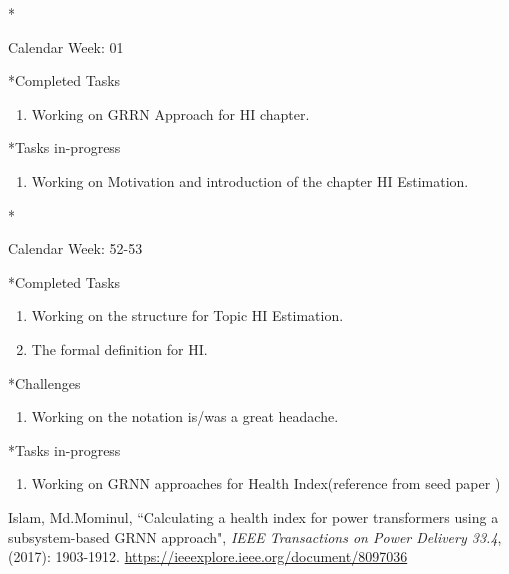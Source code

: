 \documentclass[11pt,a4paper]{article}
\begin{document}
\newpage
\begin{section}*{Calendar Week: 01 \hfill \date{08 January, 2021}}

\begin{subsection}*{Completed Tasks}
    \begin{enumerate}
        \item
        Working on GRRN Approach for HI chapter.
    \end{enumerate}
\end{subsection}

\begin{subsection}*{Tasks in-progress}
    \begin{enumerate}
        \item
        Working on Motivation and introduction of the chapter HI Estimation. 
    \end{enumerate}
\end{subsection}
\end{section}

\newpage
\begin{section}*{Calendar Week: 52-53 \hfill \date{30 December, 2020}}

\begin{subsection}*{Completed Tasks}
    \begin{enumerate}
        \item
        Working on the structure for Topic HI Estimation.
        \item
            The formal definition for HI.
    \end{enumerate}
\end{subsection}

\begin{subsection}*{Challenges}
    \begin{enumerate}
        \item
            Working on the notation is/was a great headache.
    \end{enumerate}
\end{subsection}

\begin{subsection}*{Tasks in-progress}
    \begin{enumerate}
        \item
        Working on GRNN approaches for Health Index(reference from seed paper \cite{seed_Literature_1.1}) 
    \end{enumerate}
\end{subsection}

\begin{thebibliography}{9}
    {Islam, Md.Mominul}, 
    “Calculating a health index for power transformers using a subsystem-based GRNN approach",
    \textit{ IEEE Transactions on Power Delivery 33.4}, (2017): 1903-1912.
    \href{ https://ieeexplore.ieee.org/document/8097036}{ https://ieeexplore.ieee.org/document/8097036}
\end{thebibliography}
\end{section}
\end{document}
